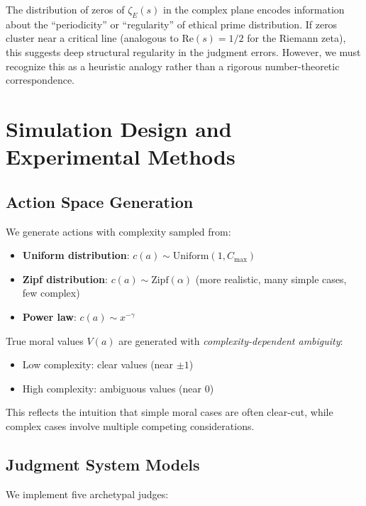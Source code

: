 \documentclass[12pt,a4paper]{article}
\theoremstyle{definition}
\theoremstyle{remark}
\begin{document}
The distribution of zeros of $\zeta_E(s)$ in the complex plane encodes information about the ``periodicity'' or ``regularity'' of ethical prime distribution. If zeros cluster near a critical line (analogous to $\text{Re}(s) = 1/2$ for the Riemann zeta), this suggests deep structural regularity in the judgment errors. However, we must recognize this as a heuristic analogy rather than a rigorous number-theoretic correspondence.

\section{Simulation Design and Experimental Methods}
\label{sec:framework}

\subsection{Action Space Generation}

We generate actions with complexity sampled from:
\begin{itemize}
    \item \textbf{Uniform distribution}: $c(a) \sim \text{Uniform}(1, C_{\max})$
    \item \textbf{Zipf distribution}: $c(a) \sim \text{Zipf}(\alpha)$ (more realistic, many simple cases, few complex)
    \item \textbf{Power law}: $c(a) \sim x^{-\gamma}$
\end{itemize}

True moral values $V(a)$ are generated with \emph{complexity-dependent ambiguity}:
\begin{itemize}
    \item Low complexity: clear values (near $\pm 1$)
    \item High complexity: ambiguous values (near $0$)
\end{itemize}

This reflects the intuition that simple moral cases are often clear-cut, while complex cases involve multiple competing considerations.

\subsection{Judgment System Models}

We implement five archetypal judges:
\end{document}
